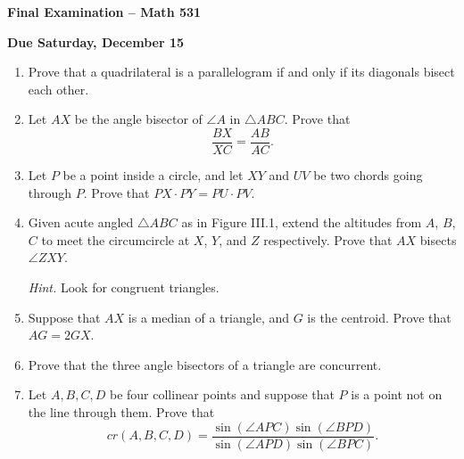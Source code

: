 \documentclass[12pt]{article}
\begin{document}
\setlength{\topmargin}{-2mm}





\begin{center}{\bf Final Examination -- Math 531}
\end{center}
\begin{center}
{\bf Due Saturday, December 15}
\end{center}

\begin{enumerate}[(1)]
\item
Prove that a quadrilateral is a parallelogram if and only if its diagonals bisect each other.
\item
Let $AX$ be the angle bisector of $\angle A$ in $\triangle ABC$. Prove that
\begin{equation}
\frac{BX}{XC} = \frac{AB}{AC}.
\end{equation}

\item
Let $P$ be a point inside a circle, and let $XY$ and $UV$ be two chords going through $P$.
Prove that $PX \cdot PY = PU \cdot PV$.

\item
Given acute angled $\triangle ABC$ as in Figure III.1, extend the altitudes from $A$, $B$, $C$
to meet the circumcircle at $X$, $Y$, and $Z$ respectively. Prove that $AX$ bisects $\angle Z X Y$.

{\itshape Hint.} Look for congruent triangles.
\item
Suppose that $AX$ is a median of a triangle, and $G$ is the centroid. Prove that $AG = 2 GX$.

\item
Prove that the three angle bisectors of a triangle are concurrent.
\item
Let $A, B, C, D$ be four collinear points and suppose that $P$ is a point not on the line
through them. Prove that
$$cr(A, B, C, D) = \frac{ \sin(\angle APC) \sin( \angle BPD)}{ \sin( \angle APD) \sin(\angle BPC)}.$$
\end{enumerate}
\end{document}
